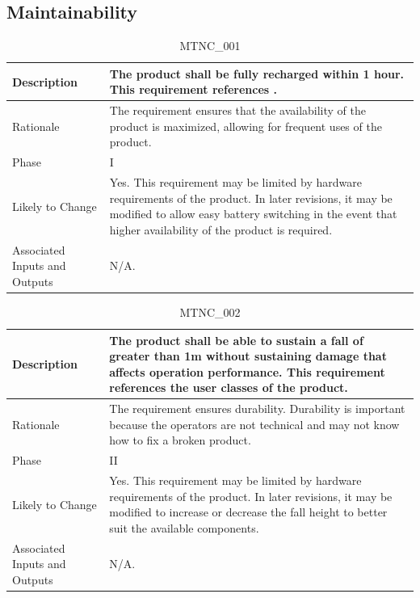 \documentclass{article}
\begin{document}
\subsection{Maintainability}
\begin{table}[!h]
\begin{center}
\caption {MTNC\_001} 
\label{MTNC_001}
\begin{tabular}{ | m{3cm} | m{11cm} | }
\hline
Description & The product shall be fully recharged within 1 hour. This requirement references \nameref{USE_003}. \\
\hline
Rationale & The requirement ensures that the availability of the product is maximized, allowing for frequent uses of the product. \\
\hline
Phase & I \\
\hline
Likely to Change & Yes. This requirement may be limited by hardware requirements of the product. In later revisions, it may be modified to allow easy battery switching in the event that higher availability of the product is required. \\
\hline
Associated Inputs and Outputs & N/A.  \\
\hline
\end{tabular}
\end{center}
\end{table}

\begin{table}[!h]
\begin{center}
\caption {MTNC\_002} 
\label{MTNC_002}
\begin{tabular}{ | m{3cm} | m{11cm} | }
\hline
Description & The product shall be able to sustain a fall of greater than 1m without sustaining damage that affects operation performance. This requirement references the user classes of the product.\\
\hline
Rationale & The requirement ensures durability. Durability is important because the operators are not technical and may not know how to fix a broken product. \\
\hline
Phase & II \\
\hline
Likely to Change & Yes. This requirement may be limited by hardware requirements of the product. In later revisions, it may be modified to increase or decrease the fall height to better suit the available components. \\
\hline
Associated Inputs and Outputs & N/A.  \\
\hline
\end{tabular}
\end{center}
\end{table}
\end{document}
